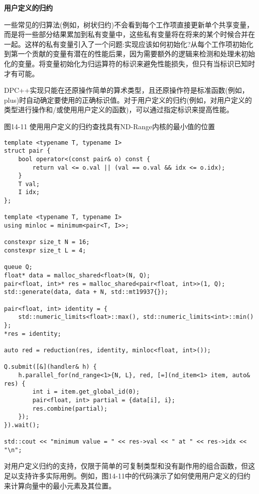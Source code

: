\hspace*{\fill} \par %
\textbf{用户定义的归约}

一些常见的归算法(例如，树状归约)不会看到每个工作项直接更新单个共享变量，而是将一些部分结果累加到私有变量中，这些私有变量将在将来的某个时候合并在一起。这样的私有变量引入了一个问题:实现应该如何初始化?从每个工作项初始化到第一个贡献的变量有潜在的性能后果，因为需要额外的逻辑来检测和处理未初始化的变量。将变量初始化为归运算符的标识来避免性能损失，但只有当标识已知时才有可能。\par

DPC++实现只能在还原操作简单的算术类型，且还原操作符是标准函数(例如，plus)时自动确定要使用的正确标识值。对于用户定义的归约(例如，对用户定义的类型进行操作和/或使用用户定义的函数)，可以通过指定标识来提高性能。\par

\hspace*{\fill} \par %
图14-11 使用用户定义的归约查找具有ND-Range内核的最小值的位置
\begin{lstlisting}[caption={}]
template <typename T, typename I>
struct pair {
	bool operator<(const pair& o) const {
		return val <= o.val || (val == o.val && idx <= o.idx);
	}
	T val;
	I idx;
};

template <typename T, typename I>
using minloc = minimum<pair<T, I>>;

constexpr size_t N = 16;
constexpr size_t L = 4;

queue Q;
float* data = malloc_shared<float>(N, Q);
pair<float, int>* res = malloc_shared<pair<float, int>>(1, Q);
std::generate(data, data + N, std::mt19937{});

pair<float, int> identity = {
	std::numeric_limits<float>::max(), std::numeric_limits<int>::min()
};
*res = identity;

auto red = reduction(res, identity, minloc<float, int>());

Q.submit([&](handler& h) {
	h.parallel_for(nd_range<1>{N, L}, red, [=](nd_item<1> item, auto& res) {
		int i = item.get_global_id(0);
		pair<float, int> partial = {data[i], i};
		res.combine(partial);
	});
}).wait();

std::cout << "minimum value = " << res->val << " at " << res->idx << "\n";
\end{lstlisting}

对用户定义归约的支持，仅限于简单的可复制类型和没有副作用的组合函数，但这足以支持许多实际用例。例如，图14-11中的代码演示了如何使用用户定义的归约来计算向量中的最小元素及其位置。\par

